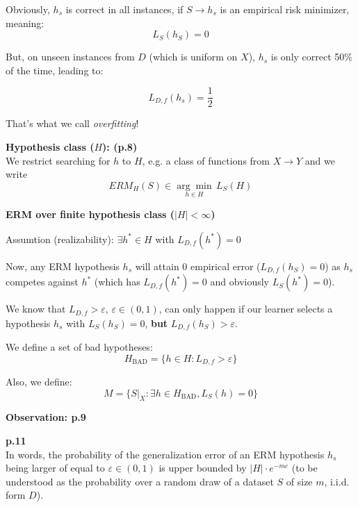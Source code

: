 \documentclass{scrarticle}
\begin{document}
Obviously, $h_s$ is correct in all instances, if $S \to h_s$ is an empirical risk minimizer, meaning:
\begin{equation*}
    L_S(h_S) =0
\end{equation*}

But, on unseen instances from $D$ (which is uniform on $X$), $h_s$ is only correct 50\% of the time, leading to: 

\begin{equation*}
    L_{D,f}(h_s) = \frac{1}{2}
\end{equation*}

That's what we call \textit{overfitting}!


\textbf{Hypothesis class ($H$): (p.8)}\\
We restrict searching for $h$ to $H$, e.g. a class of functions from $X \to Y$ and we write 
\begin{equation}
    ERM_H (S) \in \underset{h \in H}{\arg \min} \,  L_S(H)
\end{equation}

\textbf{ERM over finite hypothesis class ($|H| < \infty$)}


Assumtion (realizability): $\exists h^* \in H$ with $L_{D,f}(h^*) =0$

Now, any ERM hypothesis $h_s$ will attain $0$ empirical error ($L_{D,f}(h_S)=0$) as $h_s$ competes against $h^*$ (which has $L_{D,f}(h^*) =0$ and obviously $L_S(h^*)=0$). 

We know that $L_{D,f}>\varepsilon,\, \varepsilon \in (0,1)$, can only happen if our learner selects a hypothesis $h_s$ with $L_S(h_S)=0$, \textbf{but} $L_{D,f}(h_S) > \varepsilon$.

We define a set of bad hypotheses: 
\begin{equation*}
    H_{\text{BAD}}=\{h \in H: L_{D,f} > \varepsilon\}
\end{equation*}

Also, we define: 
\begin{equation*}
    M=\{S|_X: \exists h \in H_{\text{BAD}}, L_S(h)=0\}
\end{equation*}

\textbf{Observation: p.9}



\textbf{p.11}\\
In words, the probability of the generalization error of an ERM hypothesis $h_s$ being larger of equal to $\varepsilon \in (0,1)$ is upper bounded by $|H|\cdot e^{-mc}$ (to be understood as the probability over a random draw of a dataset $S$ of size $m$, i.i.d. form $D$).
\end{document}
